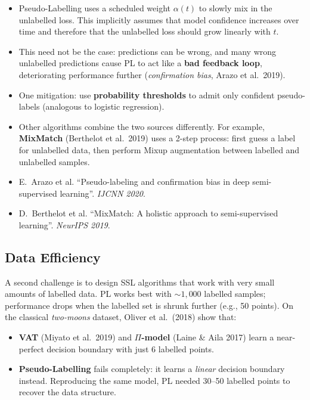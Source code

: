\documentclass[11pt,a4paper]{article}
\theoremstyle{definition}
\theoremstyle{plain}
\theoremstyle{remark}
\begin{document}
\begin{itemize}
    \item Pseudo-Labelling uses a scheduled weight $\alpha(t)$ to slowly mix in the unlabelled loss. This implicitly assumes that model confidence increases over time and therefore that the unlabelled loss should grow linearly with $t$.
    \item This need not be the case: predictions can be wrong, and many wrong unlabelled predictions cause PL to act like a \textbf{bad feedback loop}, deteriorating performance further (\textit{confirmation bias}, Arazo et al.\ 2019).
    \item One mitigation: use \textbf{probability thresholds} to admit only confident pseudo-labels (analogous to logistic regression).
    \item Other algorithms combine the two sources differently. For example, \textbf{MixMatch} (Berthelot et al.\ 2019) uses a 2-step process: first guess a label for unlabelled data, then perform Mixup augmentation between labelled and unlabelled samples.
\end{itemize}

\begin{tcolorbox}[colback=blue!5!white,colframe=blue!60!black,title={References}]
\begin{itemize}[leftmargin=*]
    \item E.\ Arazo et al. ``Pseudo-labeling and confirmation bias in deep semi-supervised learning''. \textit{IJCNN 2020}.
    \item D.\ Berthelot et al. ``MixMatch: A holistic approach to semi-supervised learning''. \textit{NeurIPS 2019}.
\end{itemize}
\end{tcolorbox}

\subsection{Data Efficiency}

A second challenge is to design SSL algorithms that work with very small amounts of labelled data. PL works best with $\sim 1{,}000$ labelled samples; performance drops when the labelled set is shrunk further (e.g., 50 points). On the classical \emph{two-moons} dataset, Oliver et al.\ (2018) show that:
\begin{itemize}
    \item \textbf{VAT} (Miyato et al.\ 2019) and \textbf{$\Pi$-model} (Laine \& Aila 2017) learn a near-perfect decision boundary with just 6 labelled points.
    \item \textbf{Pseudo-Labelling} fails completely: it learns a \emph{linear} decision boundary instead. Reproducing the same model, PL needed 30--50 labelled points to recover the data structure.
\end{itemize}
\end{document}
